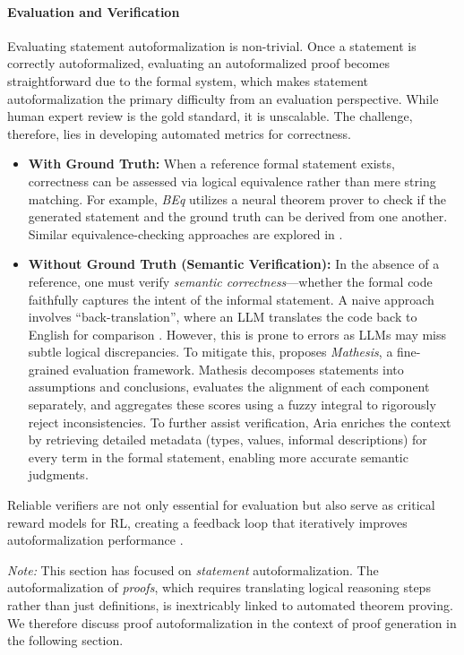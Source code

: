 \documentclass[11pt]{article}
\numberwithin{equation}{section}
\begin{document}
\paragraph{Evaluation and Verification}
Evaluating statement autoformalization is non-trivial. Once a statement is correctly autoformalized, evaluating an autoformalized proof becomes straightforward due to the formal system, which makes statement autoformalization the primary difficulty from an evaluation perspective. While human expert review is the gold standard, it is unscalable. The challenge, therefore, lies in developing automated metrics for correctness.
\begin{itemize}
    \item \textbf{With Ground Truth:} When a reference formal statement exists, correctness can be assessed via logical equivalence rather than mere string matching. For example, \textit{BEq} \cite{liu2025rethinking} utilizes a neural theorem prover to check if the generated statement and the ground truth can be derived from one another. Similar equivalence-checking approaches are explored in \cite{liu2025assess,poiroux2025reliable}.

    \item \textbf{Without Ground Truth (Semantic Verification):} In the absence of a reference, one must verify \textit{semantic correctness}—whether the formal code faithfully captures the intent of the informal statement. A naive approach involves ``back-translation'', where an LLM translates the code back to English for comparison \cite{ying2024lean,gao2025herald}. However, this is prone to errors as LLMs may miss subtle logical discrepancies. To mitigate this, \cite{xuejun2025mathesis} proposes \textit{Mathesis}, a fine-grained evaluation framework. Mathesis decomposes statements into assumptions and conclusions, evaluates the alignment of each component separately, and aggregates these scores using a fuzzy integral to rigorously reject inconsistencies. To further assist verification, Aria \cite{wang2025aria} enriches the context by retrieving detailed metadata (types, values, informal descriptions) for every term in the formal statement, enabling more accurate semantic judgments.
\end{itemize}
Reliable verifiers are not only essential for evaluation but also serve as critical reward models for RL, creating a feedback loop that iteratively improves autoformalization performance \cite{xuejun2025mathesis,lu2024process,huang2025formarl}.

\textit{Note:} This section has focused on \textit{statement} autoformalization. The autoformalization of \textit{proofs}, which requires translating logical reasoning steps rather than just definitions, is inextricably linked to automated theorem proving. We therefore discuss proof autoformalization in the context of proof generation in the following section.
\end{document}
